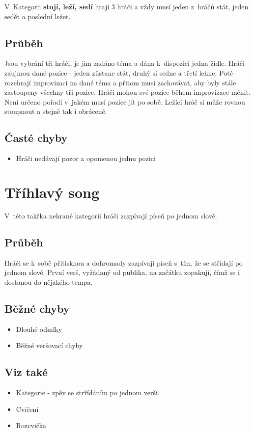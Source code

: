 V~Kategorii \textbf{stojí, leží, sedí} hrají 3 hráči a vždy musí jeden z~hráčů stát, jeden sedět a poslední ležet. 
 
\subsection{ Průběh } Jsou vybrání tři hráči, je jim zadáno téma a dána k~dispozici jedna židle. Hráči zaujmou dané pozice - jeden zůstane stát, druhý si sedne a třetí lehne. Poté rozehrají improvizaci na dané téma a přitom musí zachovávat, aby byly stále zastoupeny všechny tři pozice. Hráči mohou své pozice během improvizace měnit. Není určeno pořadí v~jakém musí pozice jít po sobě. Ležící hráč si může rovnou stoupnout a stejně tak i obráceně.  
 
\subsection{ Časté chyby } \begin{itemize}
\item Hráči nedávají pozor a opomenou jednu pozici
\end{itemize}
 
 
 
 
\needspace{5cm} \section{Tříhlavý song} \label{tříhlavý song}  
V~této takřka nehrané kategorii hráči zazpívají píseň po jednom slově. 
\subsection{Průběh} Hráči se k~sobě přitisknou a dohromady zazpívají píseň s~tím, že se střídají po jednom slově. První verš, vyžádaný od publika, na začátku zopakují, čímž se i dostanou do nějakého tempa.  
 
\subsection{Běžné chyby} \begin{itemize}
\item Dlouhé odmlky
\item Běžné veršovací chyby
\end{itemize}
 
\subsection{Viz také} \begin{itemize}
\item Kategorie  - zpěv se strřídáním po jednom verši.
\item Cvičení 
\item Rozcvička 
\end{itemize}
 
